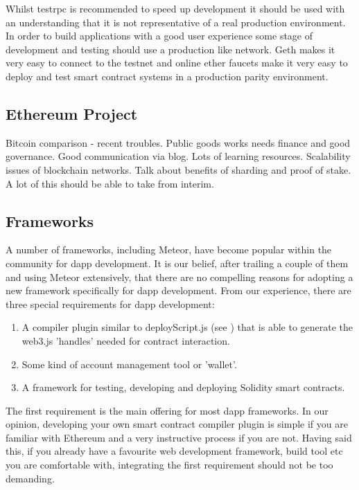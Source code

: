 Whilst testrpc is recommended to speed up development it should be used with an understanding that it is not representative of a real production environment. In order to build applications with a good user experience some stage of development and testing should use a production like network. Geth makes it very easy to connect to the testnet and online ether faucets make it very easy to deploy and test smart contract systems in a production parity environment. \\

\subsection{Ethereum Project}

Bitcoin comparison - recent troubles.
Public goods works needs finance and good governance.
Good communication via blog. Lots of learning resources.
Scalability issues of blockchain networks. Talk about benefits of sharding and proof of stake.
A lot of this should be able to take from interim. 

\subsection{Frameworks}
A number of frameworks, including Meteor, have become popular within the community for dapp development. It is our belief, after trailing a couple of them and using Meteor extensively, that there are no compelling reasons for adopting a new framework specifically for dapp development. From our experience, there are three special requirements for dapp development:

\begin{enumerate}
\item A compiler plugin similar to deployScript.js (see ) that is able to generate the web3.js 'handles' needed for contract interaction.
\item Some kind of account management tool or 'wallet'.
\item A framework for testing, developing and deploying Solidity smart contracts. 
\end{enumerate}

The first requirement is the main offering for most dapp frameworks. In our opinion, developing your own smart contract compiler plugin is simple if you are familiar with Ethereum and a very instructive process if you are not. Having said this, if you already have a favourite web development framework, build tool etc you are comfortable with, integrating the first requirement should not be too demanding.\\

